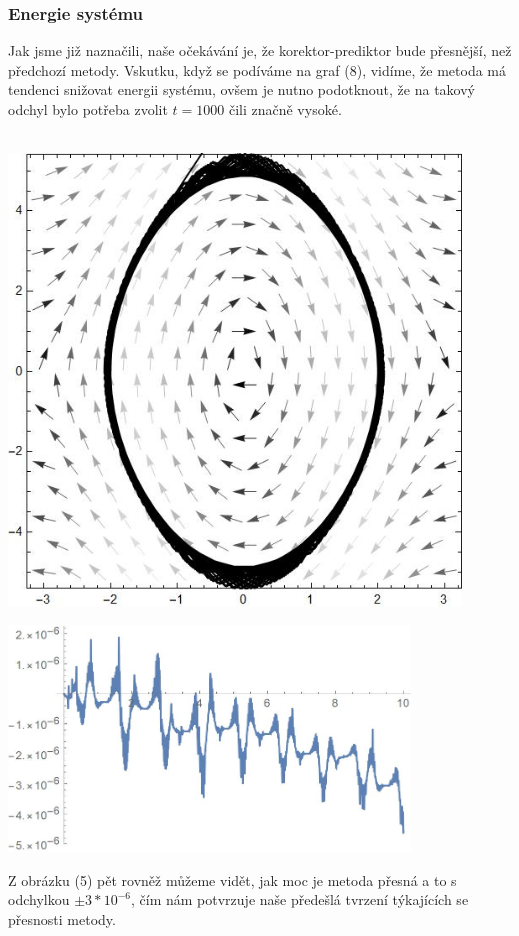 \documentclass[reqno, a4paper]{amsart}
\begin{document}
				\subsubsection{Energie systému}
				Jak jsme již naznačili, naše očekávání je, že korektor-prediktor bude přesnější, než předchozí metody. Vskutku, když se podíváme na graf (8), vidíme, že metoda má tendenci snižovat energii systému, ovšem je nutno podotknout, že na takový odchyl bylo potřeba zvolit $t=1 000$ čili značně vysoké.\\
				\\
				
				\begin{minipage}{\textwidth}
					\begin{minipage}[b]{0.4\textwidth}
						\centering
						\includegraphics[width=0.9\textwidth]{adams}
					\end{minipage}
					\begin{minipage}[b]{0.79\textwidth}
						\centering
						\includegraphics[width=0.8\textwidth]{grafik}
					\end{minipage}
					\hfill
				\end{minipage}
				Z obrázku (5) pět rovněž můžeme vidět, jak moc je metoda přesná a to s odchylkou $\pm 3*10^{-6}$, čím nám potvrzuje naše předešlá tvrzení týkajících se přesnosti metody.
\end{document}

